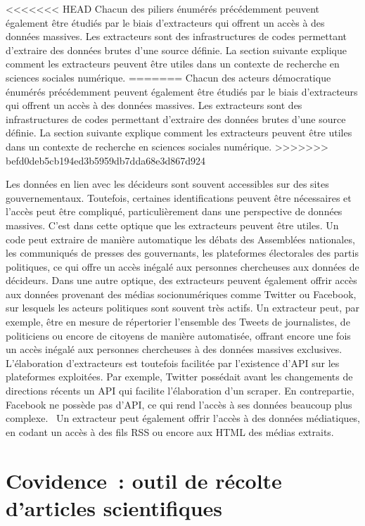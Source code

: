 \documentclass[
  letterpaper,
]{scrbook}
\begin{document}
<<<<<<< HEAD
Chacun des piliers énumérés précédemment peuvent également être étudiés
par le biais d'extracteurs qui offrent un accès à des données massives.
Les extracteurs sont des infrastructures de codes permettant d'extraire
des données brutes d'une source définie. La section suivante explique
comment les extracteurs peuvent être utiles dans un contexte de
recherche en sciences sociales numérique.
=======
Chacun des acteurs démocratique énumérés précédemment peuvent également
être étudiés par le biais d'extracteurs qui offrent un accès à des
données massives. Les extracteurs sont des infrastructures de codes
permettant d'extraire des données brutes d'une source définie. La
section suivante explique comment les extracteurs peuvent être utiles
dans un contexte de recherche en sciences sociales numérique.
>>>>>>> befd0deb5cb194ed3b5959db7dda68e3d867d924

Les données en lien avec les décideurs sont souvent accessibles sur des
sites gouvernementaux. Toutefois, certaines identifications peuvent être
nécessaires et l'accès peut être compliqué, particulièrement dans une
perspective de données massives. C'est dans cette optique que les
extracteurs peuvent être utiles. Un code peut extraire de manière
automatique les débats des Assemblées nationales, les communiqués de
presses des gouvernants, les plateformes électorales des partis
politiques, ce qui offre un accès inégalé aux personnes chercheuses aux
données de décideurs. Dans une autre optique, des extracteurs peuvent
également offrir accès aux données provenant des médias socionumériques
comme Twitter ou Facebook, sur lesquels les acteurs politiques sont
souvent très actifs. Un extracteur peut, par exemple, être en mesure de
répertorier l'ensemble des Tweets de journalistes, de politiciens ou
encore de citoyens de manière automatisée, offrant encore une fois un
accès inégalé aux personnes chercheuses à des données massives
exclusives. L'élaboration d'extracteurs est toutefois facilitée par
l'existence d'API sur les plateformes exploitées. Par exemple, Twitter
possédait avant les changements de directions récents un API qui
facilite l'élaboration d'un scraper. En contrepartie, Facebook ne
possède pas d'API, ce qui rend l'accès à ses données beaucoup plus
complexe. ~Un extracteur peut également offrir l'accès à des données
médiatiques, en codant un accès à des fils RSS ou encore aux HTML des
médias extraits.

\hypertarget{covidence-outil-de-ruxe9colte-darticles-scientifiques}{%
\section{\texorpdfstring{\textbf{Covidence~: outil de récolte d'articles
scientifiques}}{Covidence~: outil de récolte d'articles scientifiques}}\label{covidence-outil-de-ruxe9colte-darticles-scientifiques}}
\end{document}

